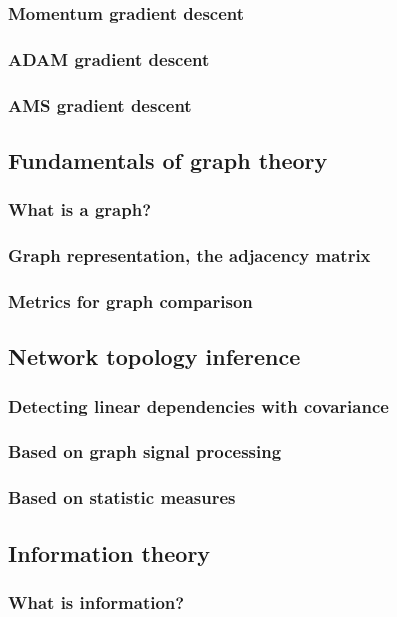 \documentclass{article}
\begin{document}
\subsubsection{Momentum gradient descent}
\subsubsection{ADAM gradient descent}
\subsubsection{AMS gradient descent}
\subsection{Fundamentals of graph theory}
\subsubsection{What is a graph?}
\subsubsection{Graph representation, the adjacency matrix}
\subsubsection{Metrics for graph comparison}
\subsection{Network topology inference}
\subsubsection{Detecting linear dependencies with covariance}
\subsubsection{Based on graph signal processing}
\subsubsection{Based on statistic measures}
\subsection{Information theory}
\subsubsection{What is information?}
\end{document}
